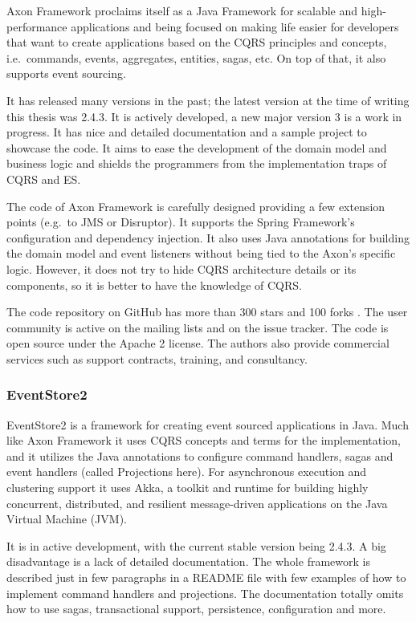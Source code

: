 \documentclass{book}
\begin{document}
Axon Framework \cite{axon} proclaims itself as a Java Framework for
scalable and high-performance applications and being focused on making
life easier for developers that want to create applications based on the
CQRS principles and concepts, i.e.~commands, events, aggregates,
entities, sagas, etc. On top of that, it also supports event sourcing.

It has released many versions in the past; the latest version at the
time of writing this thesis was 2.4.3. It is actively developed, a new
major version 3 is a work in progress. It has nice and detailed
documentation and a sample project to showcase the code. It aims to ease
the development of the domain model and business logic and shields the
programmers from the implementation traps of CQRS and ES.

The code of Axon Framework is carefully designed providing a few
extension points (e.g.~to JMS or Disruptor). It supports the Spring
Framework's configuration and dependency injection. It also uses Java
annotations for building the domain model and event listeners without
being tied to the Axon's specific logic. However, it does not try to
hide CQRS architecture details or its components, so it is better to
have the knowledge of CQRS.

The code repository on GitHub has more than 300 stars and 100 forks
\cite{axon-repo}. The user community is active on the mailing lists and
on the issue tracker. The code is open source under the Apache 2
license. The authors also provide commercial services such as support
contracts, training, and consultancy.

\subsubsection{EventStore2}\label{eventstore2}

EventStore2 \cite{eventstore2} is a framework for creating event sourced
applications in Java. Much like Axon Framework it uses CQRS concepts and
terms for the implementation, and it utilizes the Java annotations to
configure command handlers, sagas and event handlers (called Projections
here). For asynchronous execution and clustering support it uses Akka, a
toolkit and runtime for building highly concurrent, distributed, and
resilient message-driven applications on the Java Virtual Machine (JVM).

It is in active development, with the current stable version being
2.4.3. A big disadvantage is a lack of detailed documentation. The whole
framework is described just in few paragraphs in a README file with few
examples of how to implement command handlers and projections. The
documentation totally omits how to use sagas, transactional support,
persistence, configuration and more.
\end{document}
